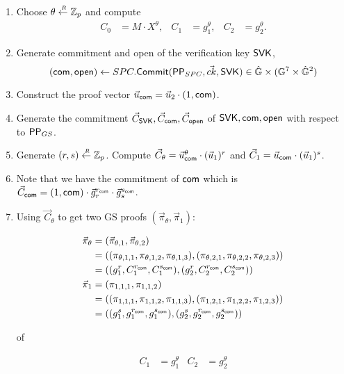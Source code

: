 \begin{description}
\begin{enumerate}
  \item Choose $\theta \stackrel{{\scriptscriptstyle \mkern4mu R}}{\gets} \mathbb{Z}_p$ and compute
    \begin{align*}
      C_0 &= M\cdot X^{\theta}, & C_1 &= g_1^{\theta}, & C_2 &= g_2^{\theta}.
    \end{align*}
  \item Generate commitment and open of the verification key $\mathsf{SVK}$, 
    $$(\mathsf{com}, \mathsf{open}) \gets SPC.{\mathsf{Commit}}(\mathsf{PP}_{SPC}, \vec{ck}, \mathsf{SVK}) \in \hat{\mathbb{G}} \times (\mathbb{G}^7 \times \hat{\mathbb{G}}^2)$$
  \item Construct the proof vector $\vec{u}_{\mathsf{com}} = \vec{u}_2\cdot (1, \mathsf{com})$.
  \item Generate the commitment $\vec{C}_{\mathsf{SVK}}, \vec{C}_{\mathsf{com}}, \vec{C}_{\mathsf{open}}$ of $\mathsf{SVK}, \mathsf{com}, \mathsf{open}$ with respect to $\mathsf{PP}_{GS}$.
  \item Generate $(r,s) \stackrel{{\scriptscriptstyle \mkern4mu R}}{\gets} \mathbb{Z}_p$. Compute $\vec{C}_{\theta} = \vec{u}_{\mathsf{com}}^{\theta} \cdot (\vec{u}_1)^r$ and $\vec{C}_{1} = \vec{u}_{\mathsf{com}} \cdot (\vec{u}_1)^s$.
  \item Note that we have the commitment of $\mathsf{com}$ which is $\vec{C}_{\mathsf{com}} = (1, \mathsf{com}) \cdot \vec{g}_r^{r_{\mathsf{com}}} \cdot \vec{g}_s^{s_{\mathsf{com}}}$.
  \item Using $\vec{C}_{\theta}$ to get two GS proofs $(\vec{\pi}_{\theta}, \vec{\pi}_1)$:

    \begin{align*}
      \vec{\pi}_{\theta} &= (\vec{\pi}_{\theta,1}, \vec{\pi}_{\theta,2})\\
      &= ((\pi_{\theta,1,1}, \pi_{\theta,1,2}, \pi_{\theta,1,3}), (\pi_{\theta,2,1}, \pi_{\theta,2,2}, \pi_{\theta,2,3}))\\
      &= ((g_1^r, C_1^{r_{\mathsf{com}}}, C_1^{s_{\mathsf{com}}}),(g_2^r, C_2^{r_{\mathsf{com}}}, C_2^{s_{\mathsf{com}}}))\\     
      \vec{\pi}_{1} &= (\pi_{1,1,1}, \pi_{1,1,2})\\
      &= ((\pi_{1,1,1}, \pi_{1,1,2}, \pi_{1,1,3}), (\pi_{1,2,1}, \pi_{1,2,2}, \pi_{1,2,3}))\\
      &= ((g_1^s, g_1^{r_{\mathsf{com}}}, g_1^{s_{\mathsf{com}}}),(g_2^s, g_2^{r_{\mathsf{com}}}, g_2^{s_{\mathsf{com}}}))
    \end{align*}

    of
    
    \begin{align*}
      C_1 &= g_1^{\theta} & C_2 &= g_2^{\theta}
    \end{align*}


\end{enumerate}
\end{description}
